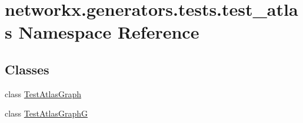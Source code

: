 \hypertarget{namespacenetworkx_1_1generators_1_1tests_1_1test__atlas}{}\section{networkx.\+generators.\+tests.\+test\+\_\+atlas Namespace Reference}
\label{namespacenetworkx_1_1generators_1_1tests_1_1test__atlas}
\subsection*{Classes}
\begin{DoxyCompactItemize}
\item 
class \hyperlink{classnetworkx_1_1generators_1_1tests_1_1test__atlas_1_1TestAtlasGraph}{Test\+Atlas\+Graph}
\item 
class \hyperlink{classnetworkx_1_1generators_1_1tests_1_1test__atlas_1_1TestAtlasGraphG}{Test\+Atlas\+GraphG}
\end{DoxyCompactItemize}
